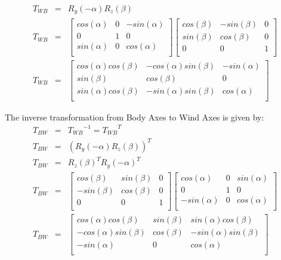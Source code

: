 \begin{eqnarray}
    T_{WB} &=& R_y(-\alpha) R_z(\beta) \\
    T_{WB} &=&
    \begin{bmatrix}
        cos(\alpha)&    0&      -sin(\alpha)\\
        0&              1&      0\\
        sin(\alpha)&    0&      cos(\alpha)\\
    \end{bmatrix}
    \begin{bmatrix}
        cos(\beta)&   -sin(\beta)&    0\\
        sin(\beta)&    cos(\beta)&    0\\
        0&              0&            1\\
    \end{bmatrix}\\
    T_{WB} &=&
    \begin{bmatrix}
        cos(\alpha)cos(\beta)&    -cos(\alpha)sin(\beta)&   -sin(\alpha)\\
        sin(\beta)&                cos(\beta)&               0\\
        sin(\alpha)cos(\beta)&    -sin(\alpha)sin(\beta)&   cos(\alpha)\\
    \end{bmatrix}
\end{eqnarray}

The inverse transformation from Body Axes to Wind Axes is given by:
\begin{eqnarray}
    T_{BW} &=& {T_{WB}}^{-1} = {T_{WB}}^{T} \\
    T_{BW} &=& (R_y(-\alpha) R_z(\beta))^T \\
    T_{BW} &=& R_z(\beta)^T R_y(-\alpha)^T \\
    T_{BW} &=&
    \begin{bmatrix}
        cos(\beta)&     sin(\beta)&    0\\
        -sin(\beta)&    cos(\beta)&    0\\
        0&              0&             1\\
    \end{bmatrix}
    \begin{bmatrix}
        cos(\alpha)&    0&      sin(\alpha)\\
        0&              1&      0\\
        -sin(\alpha)&   0&      cos(\alpha)\\
    \end{bmatrix}\\
    T_{BW} &=&
    \begin{bmatrix}
        cos(\alpha)cos(\beta)&    sin(\beta)&   sin(\alpha)cos(\beta)\\
       -cos(\alpha)sin(\beta)&    cos(\beta)&  -sin(\alpha)sin(\beta)\\
       -sin(\alpha)&              0&            cos(\alpha)\\
    \end{bmatrix}
\end{eqnarray}


